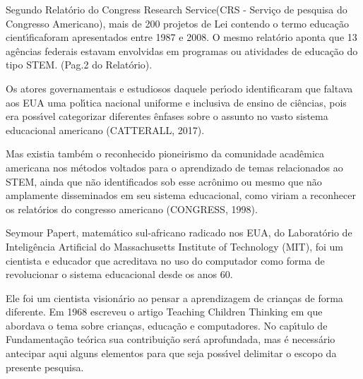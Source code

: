 \documentclass[
12pt,		%
openright,	%
twoside,  %
a4paper,			%
chapter=TITLE,		%
english,			%
french,				%
spanish,			%
brazil				%
]{USPSC-classe/USPSC}
\begin{document}
Segundo Relat\'orio do \textquotedbl Congress Research Service\textquotedbl  (CRS - Servi\c{c}o de pesquisa do Congresso Americano), mais de 200 projetos de Lei contendo o termo \textquotedbl educa\c{c}\~ao cient\'{\i}fica\textquotedbl  foram apresentados entre 1987 e 2008. O mesmo relat\'orio aponta que 13 ag\^encias federais estavam envolvidas em programas ou atividades de educa\c{c}\~ao do tipo \textquotedbl STEM\textquotedbl . (Pag.2 do Relat\'orio).









Os atores governamentais e estudiosos daquele per\'{\i}odo identificaram que faltava aos EUA uma pol\'{\i}tica nacional uniforme e inclusiva de ensino de ci\^encias, pois era poss\'{\i}vel categorizar diferentes \^enfases sobre o assunto no vasto sistema educacional americano  (CATTERALL, 2017).









Mas existia tamb\'em o reconhecido pioneirismo da comunidade acad\^emica americana nos m\'etodos voltados para o aprendizado de temas relacionados ao STEM, ainda que n\~ao identificados sob esse acr\^onimo ou mesmo que n\~ao amplamente disseminados em seu sistema educacional, como viriam a reconhecer os relat\'orios do congresso americano  (CONGRESS, 1998).









Seymour Papert, matem\'atico sul-africano radicado nos EUA, do Laborat\'orio de Intelig\^encia Artificial do Massachusetts Institute of Technology (MIT), foi um  cientista e educador que acreditava  no  uso do computador como forma de revolucionar o sistema  educacional  desde os anos 60.









Ele foi um cientista vision\'ario ao pensar a aprendizagem de crian\c{c}as de forma diferente. Em 1968 escreveu o artigo \textquotedbl  Teaching Children Thinking \textquotedbl   em que abordava  o tema sobre crian\c{c}as, educa\c{c}\~ao e computadores. No cap\'{\i}tulo de Fundamenta\c{c}\~ao te\'orica sua contribui\c{c}\~ao ser\'a aprofundada, mas \'e necess\'ario antecipar aqui alguns elementos para que seja poss\'{\i}vel delimitar o escopo da presente pesquisa.
\end{document}
